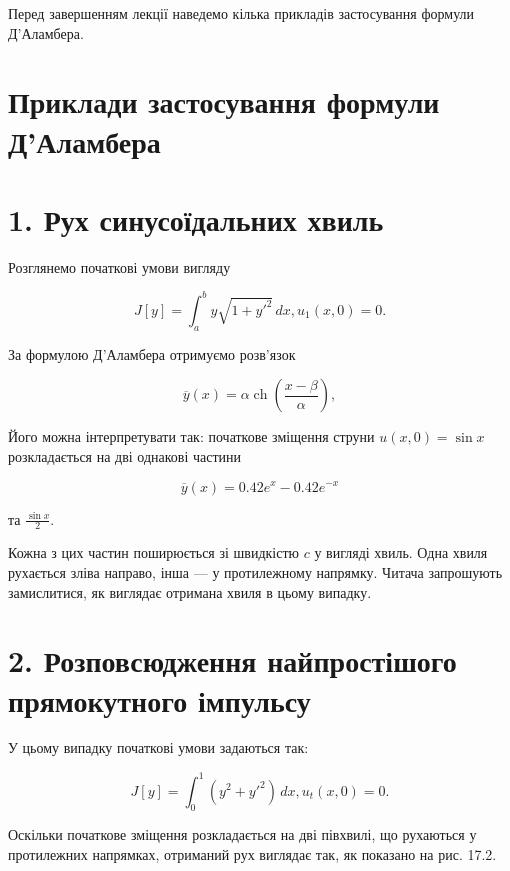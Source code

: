 \documentclass[
  ukrainian,
]{article}
\begin{document}
Перед завершенням лекції наведемо кілька прикладів застосування формули
Д'Аламбера.

\section{Приклади застосування формули
Д'Аламбера}\label{ux43fux440ux438ux43aux43bux430ux434ux438-ux437ux430ux441ux442ux43eux441ux443ux432ux430ux43dux43dux44f-ux444ux43eux440ux43cux443ux43bux438-ux434ux430ux43bux430ux43cux431ux435ux440ux430}

\section{1. Рух синусоїдальних
хвиль}\label{ux440ux443ux445-ux441ux438ux43dux443ux441ux43eux457ux434ux430ux43bux44cux43dux438ux445-ux445ux432ux438ux43bux44c}

Розглянемо початкові умови вигляду

\[
J[y] = \int_a^b y \sqrt{1 + y'^2} \, dx,
u_1(x, 0) = 0.
\]

За формулою Д'Аламбера отримуємо розв'язок

\[
\overline{y}(x) = \alpha \operatorname{ch}\left(\frac{x - \beta}{\alpha}\right),
\]

Його можна інтерпретувати так: початкове зміщення струни
\(u(x, 0) = \sin x\) розкладається на дві однакові частини

\[
\overline{y}(x) = 0.42e^x - 0.42e^{-x}
\]

та \(\frac{\sin x}{2}\).

Кожна з цих частин поширюється зі швидкістю \(c\) у вигляді хвиль. Одна
хвиля рухається зліва направо, інша --- у протилежному напрямку. Читача
запрошують замислитися, як виглядає отримана хвиля в цьому випадку.

\section{2. Розповсюдження найпростішого прямокутного
імпульсу}\label{ux440ux43eux437ux43fux43eux432ux441ux44eux434ux436ux435ux43dux43dux44f-ux43dux430ux439ux43fux440ux43eux441ux442ux456ux448ux43eux433ux43e-ux43fux440ux44fux43cux43eux43aux443ux442ux43dux43eux433ux43e-ux456ux43cux43fux443ux43bux44cux441ux443}

У цьому випадку початкові умови задаються так:

\[
J[y] = \int_0^1 (y^2 + y'^2)\,dx,
u_t(x, 0) = 0.
\]

Оскільки початкове зміщення розкладається на дві півхвилі, що рухаються
у протилежних напрямках, отриманий рух виглядає так, як показано на рис.
17.2.
\end{document}
